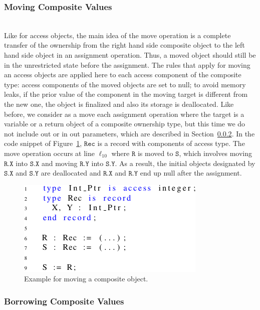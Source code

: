 \documentclass{llncs}
\newcommand\var[1]{\ensuremath{\mathtt{#1}}}
\newcommand{\keyword}[1]{\textsf{#1}}
\begin{document}
\subsubsection{Moving Composite Values}
\label{subsubsec:movingComposite}
\ \\

Like for access objects, the main idea of the move operation is a complete transfer of the ownership from the right hand side composite object to the left hand
side object in an assignment operation. Thus, a moved object should still be in the unrestricted state before the assignment. The rules that apply for moving an
access objects are applied here to each access component of the composite type: access components of the moved objects are set to null; to avoid memory leaks, if the
prior value of the component in the moving target is different from the new one, the object is finalized and also its storage is deallocated.  
Like before, we consider as a move each assignment operation where the target is a variable or a return object of a composite ownership type, but this time we do not
include \keyword{out} or \keyword{in out} parameters, which are described in Section~\ref{subsubsec:borrowComposite}.
In the code snippet of Figure~\ref{fig:movingComposite}, \var{Rec} is a record with components of access type. The move operation occurs at line $\ell_{10}$ where \var{R} is moved
to \var{S}, which involves moving \var{R.X} into \var{S.X} and moving \var{R.Y} into \var{S.Y}. As a result, the initial objects designated by
\var{S.X} and \var{S.Y} are deallocated and \var{R.X} and \var{R.Y} end up null after the assignment. 


\begin{figure}[htb!]
\centering
   \includegraphics[]{movingComposite}
   \caption{Example for moving a composite object.}
   \label{fig:movingComposite}
\end{figure}
 
\subsubsection{Borrowing Composite Values}
\label{subsubsec:borrowComposite}
\ \\
\end{document}

